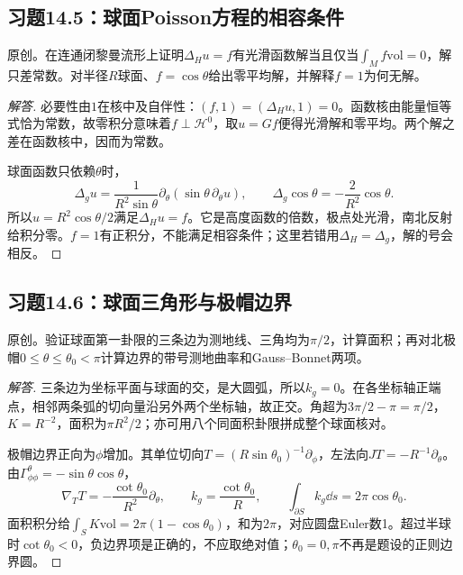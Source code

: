 \subsection*{习题14.5：球面Poisson方程的相容条件}
原创。在连通闭黎曼流形上证明$\Delta_Hu=f$有光滑函数解当且仅当$\int_Mf\mathrm{vol}=0$，解只差常数。对半径$R$球面、$f=\cos\theta$给出零平均解，并解释$f=1$为何无解。
\begin{proof}[解答]
必要性由$1$在核中及自伴性：$(f,1)=(\Delta_Hu,1)=0$。函数核由能量恒等式恰为常数，故零积分意味着$f\perp\mathcal H^0$，取$u=Gf$便得光滑解和零平均。两个解之差在函数核中，因而为常数。

球面函数只依赖$\theta$时，
\[
 \Delta_gu=\frac1{R^2\sin\theta}\partial_\theta(\sin\theta\,\partial_\theta u),
 \qquad\Delta_g\cos\theta=-\frac2{R^2}\cos\theta.
\]
所以$u=R^2\cos\theta/2$满足$\Delta_Hu=f$。它是高度函数的倍数，极点处光滑，南北反射给积分零。$f=1$有正积分，不能满足相容条件；这里若错用$\Delta_H=\Delta_g$，解的号会相反。
\end{proof}

\subsection*{习题14.6：球面三角形与极帽边界}
原创。验证球面第一卦限的三条边为测地线、三角均为$\pi/2$，计算面积；再对北极帽$0\leq\theta\leq\theta_0<\pi$计算边界的带号测地曲率和Gauss--Bonnet两项。
\begin{proof}[解答]
三条边为坐标平面与球面的交，是大圆弧，所以$k_g=0$。在各坐标轴正端点，相邻两条弧的切向量沿另外两个坐标轴，故正交。角超为$3\pi/2-\pi=\pi/2$，$K=R^{-2}$，面积为$\pi R^2/2$；亦可用八个同面积卦限拼成整个球面核对。

极帽边界正向为$\phi$增加。其单位切向$T=(R\sin\theta_0)^{-1}\partial_\phi$，左法向$JT=-R^{-1}\partial_\theta$。由$\Gamma^\theta_{\phi\phi}=-\sin\theta\cos\theta$，
\[
 \nabla_TT=-\frac{\cot\theta_0}{R^2}\partial_\theta,
 \qquad k_g=\frac{\cot\theta_0}{R},\qquad
 \int_{\partial S}k_g\dd s=2\pi\cos\theta_0.
\]
面积积分给$\int_SK\mathrm{vol}=2\pi(1-\cos\theta_0)$，和为$2\pi$，对应圆盘Euler数1。超过半球时$\cot\theta_0<0$，负边界项是正确的，不应取绝对值；$\theta_0=0,\pi$不再是题设的正则边界圆。
\end{proof}


